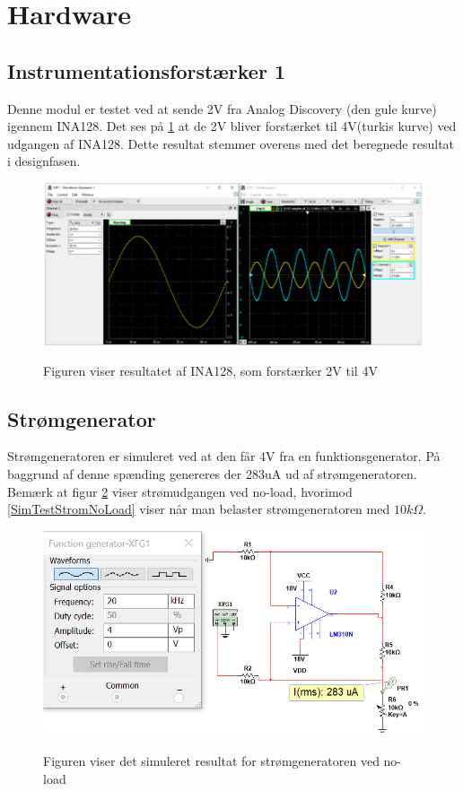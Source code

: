\section{Hardware}

\subsection{Instrumentationsforstærker 1}
Denne modul er testet ved at sende 2V fra Analog Discovery (den gule kurve) igennem INA128. Det ses på \ref{TestINA} at de 2V bliver forstærket til 4V(turkis kurve) ved udgangen af INA128. Dette resultat stemmer overens med det beregnede resultat i designfasen.    

\begin{figure}[H] 
\centering
{\includegraphics[width=\linewidth]
{Figure/TestINA1281}}
\caption{Figuren viser resultatet af INA128, som forstærker 2V til 4V}
\label{TestINA}
\end{figure}
  \pagebreak
\subsection{Strømgenerator}

Strømgeneratoren er simuleret ved at den får 4V fra en funktionsgenerator. På baggrund af denne spænding genereres der 283uA ud af strømgeneratoren. Bemærk at figur \ref{SimTestStrom} viser strømudgangen ved no-load, hvorimod \ref{SimTestStromNoLoad} viser når man belaster strømgeneratoren med $ 10k\Omega$.  

\begin{figure}[H] 
\centering
{\includegraphics[width=\linewidth]
{Figure/SimuleretStromGenerator}}
\caption{Figuren viser det simuleret resultat for  strømgeneratoren ved no-load}
\label{SimTestStrom}
\end{figure}



